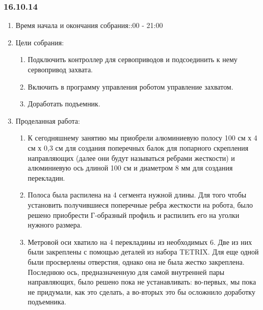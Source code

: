 
\subsubsection{16.10.14}

\begin{enumerate}
	\item Время начала и окончания собрания::00 - 21:00
	\item Цели собрания:\newline
	\begin{enumerate}
	  \item Подключить контроллер для сервоприводов и подсоединить к нему сервопривод захвата.\newline
	  
	  \item Включить в программу управления роботом управление захватом.\newline
	  
	  \item Доработать подъемник.\newline
	  
    \end{enumerate}
	\item Проделанная работа:\newline
	\begin{enumerate}
	  \item К сегодняшнему занятию мы приобрели алюминиевую полосу 100 см х 4 см х 0,3 см для создания поперечных балок для попарного скрепления направляющих (далее они будут называться ребрами жесткости) и алюминиевую ось длиной 100 см и диаметром 8 мм для создания перекладин.\newline
      
      \item  Полоса была распилена на 4 сегмента нужной длины. Для того чтобы установить получившиеся поперечные ребра жесткости на робота, было решено приобрести Г-образный профиль и распилить его на уголки нужного размера.\newline
      
      \item  Метровой оси хватило на 4 перекладины из необходимых 6. Две из них были закреплены с помощью деталей из набора TETRIX. Для еще одной были просверлены отверстия, однако она не была жестко закреплена. Последнюю ось, предназначенную для самой внутренней пары направляющих, было решено пока не устанавливать: во-первых, мы пока не придумали, как это сделать, а во-вторых это бы осложнило доработку подъемника.\newline
      

\end{enumerate}
\end{enumerate}
